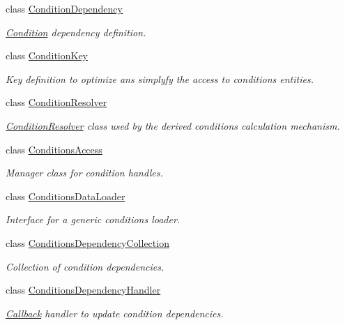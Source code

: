 \begin{DoxyCompactItemize}
class \hyperlink{class_d_d4hep_1_1_conditions_1_1_condition_dependency}{Condition\+Dependency}
\begin{DoxyCompactList}\small\item\em \hyperlink{class_d_d4hep_1_1_conditions_1_1_condition}{Condition} dependency definition. \end{DoxyCompactList}\item 
class \hyperlink{class_d_d4hep_1_1_conditions_1_1_condition_key}{Condition\+Key}
\begin{DoxyCompactList}\small\item\em Key definition to optimize ans simplyfy the access to conditions entities. \end{DoxyCompactList}\item 
class \hyperlink{class_d_d4hep_1_1_conditions_1_1_condition_resolver}{Condition\+Resolver}
\begin{DoxyCompactList}\small\item\em \hyperlink{class_d_d4hep_1_1_conditions_1_1_condition_resolver}{Condition\+Resolver} class used by the derived conditions calculation mechanism. \end{DoxyCompactList}\item 
class \hyperlink{class_d_d4hep_1_1_conditions_1_1_conditions_access}{Conditions\+Access}
\begin{DoxyCompactList}\small\item\em Manager class for condition handles. \end{DoxyCompactList}\item 
class \hyperlink{class_d_d4hep_1_1_conditions_1_1_conditions_data_loader}{Conditions\+Data\+Loader}
\begin{DoxyCompactList}\small\item\em Interface for a generic conditions loader. \end{DoxyCompactList}\item 
class \hyperlink{class_d_d4hep_1_1_conditions_1_1_conditions_dependency_collection}{Conditions\+Dependency\+Collection}
\begin{DoxyCompactList}\small\item\em Collection of condition dependencies. \end{DoxyCompactList}\item 
class \hyperlink{class_d_d4hep_1_1_conditions_1_1_conditions_dependency_handler}{Conditions\+Dependency\+Handler}
\begin{DoxyCompactList}\small\item\em \hyperlink{class_d_d4hep_1_1_callback}{Callback} handler to update condition dependencies. \end{DoxyCompactList}\item 

\end{DoxyCompactItemize}
